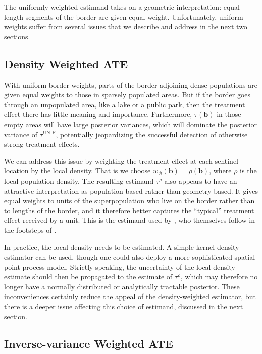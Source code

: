 \documentclass[letter]{article}
\newcommand{\border}{\mathcal{B}}
\newcommand{\sentinel}{\bm{b}}
\newcommand{\unifavg}{\tau^{\mathrm{UNIF}}}
\newcommand{\taurho}{\tau^{\rho}}
\newcommand{\weightb}{w_{\border}}
\renewcommand{\cite}[1]{\citet{#1}}
\begin{document}
The uniformly weighted estimand takes on a geometric interpretation: equal-length segments of the border are given equal weight.
Unfortunately, uniform weights suffer from several issues that we describe and address in the next two sections.
    


    	\subsection{Density Weighted ATE}\label{density-weighted-ate}

With uniform border weights, parts of the border adjoining dense populations are given equal weights to those in sparsely populated areas.
But if the border goes through an unpopulated area, like a lake or a public park, then the treatment effect there has little meaning and importance.
Furthermore, \(\tau(\sentinel)\) in those empty areas will have large posterior variances, which will dominate the posterior variance of \(\unifavg\), potentially jeopardizing the successful detection of otherwise strong treatment effects.

We can address this issue by weighting the treatment effect at each sentinel location by the local density.
That is we choose \(\weightb(\sentinel) = \rho(\sentinel)\), where \(\rho\) is the local population density.
The resulting estimand \(\taurho\) also appears to have an attractive interpretation as population-based rather than geometry-based.
It gives equal weights to units of the superpopulation who live on the border rather than to lengths of the border,
and it therefore better captures the ``typical'' treatment effect received by a unit.
This is the estimand used by \cite{keele_titiunik_2015}, who themselves follow in the footsteps of \cite{imbens2011regression}.

In practice, the local density needs to be estimated.
A simple kernel density estimator can be used,
though one could also deploy a more sophisticated spatial point process model.
Strictly speaking, the uncertainty of the local density estimate should then be propagated to the estimate of \(\taurho\), which may therefore no longer have a normally distributed or analytically tractable posterior.
These inconveniences certainly reduce the appeal of the density-weighted estimator,
but there is a deeper issue affecting this choice of estimand, discussed in the next section.
    


    	\subsection{Inverse-variance Weighted ATE}\label{inverse-variance-weighted-ate}
\end{document}
